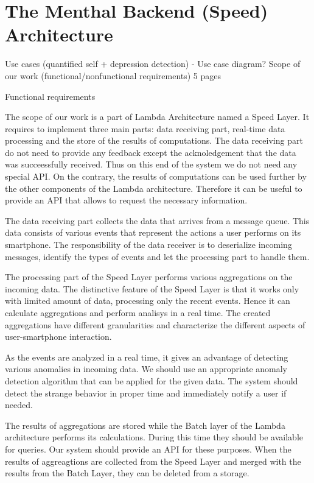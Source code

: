 \chapter{The Menthal Backend (Speed) Architecture}
\label{chap:menthal_backend_architecture}


Use cases (quantified self + depression detection) - Use case diagram?
Scope of our work (functional/nonfunctional requirements)
5 pages

Functional requirements

The scope of our work is a part of Lambda Architecture named a Speed Layer.
It requires to implement three main parts: data receiving part, real-time data processing and the store of the results of computations.
The data receiving part do not need to provide any feedback except the acknoledgement that the data was succeessfully received.
Thus on this end of the system we do not need any special API.
On the contrary, the results of computations can be used further by the other components of the Lambda architecture.
Therefore it can be useful to provide an API that allows to request the necessary information.

The data receiving part collects the data that arrives from a message queue.
This data consists of various events that represent the actions a user performs on its smartphone. 
The responsibility of the data receiver is to deserialize incoming messages, identify the types of events and let the processing part to handle them.

The processing part of the Speed Layer performs various aggregations on the incoming data.
The distinctive feature of the Speed Layer is that it works only with limited amount of data, processing only the recent events.
Hence it can calculate aggregations and perform analisys in a real time.
The created aggregations have different granularities and characterize the different aspects of user-smartphone interaction.

As the events are analyzed in a real time, it gives an advantage of detecting various anomalies in incoming data.
We should use an appropriate anomaly detection algorithm that can be applied for the given data.
The system should detect the strange behavior in proper time and immediately notify a user if needed.

The results of aggregations are stored while the Batch layer of the Lambda architecture performs its calculations.
During this time they should be available for queries.
Our system should provide an API for these purposes.
When the results of aggreagtions are collected from the Speed Layer and merged with the results from the Batch Layer, they can be deleted from a storage.
 
